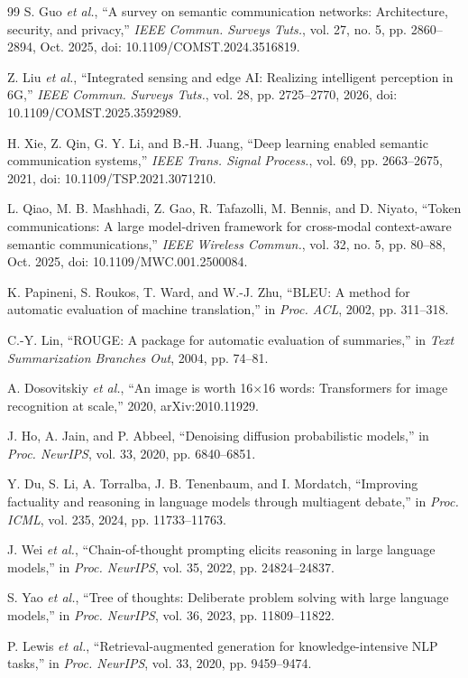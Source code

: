 \documentclass[letterpaper,journal]{IEEEtran}
\newcommand{\etal}{\emph{et al.}}
\begin{document}
\begin{thebibliography}{99}
S. Guo \etal, ``A survey on semantic communication networks: Architecture,
security, and privacy,'' \emph{IEEE Commun. Surveys Tuts.}, vol. 27, no. 5,
pp. 2860--2894, Oct. 2025, doi: 10.1109/COMST.2024.3516819.

Z. Liu \etal, ``Integrated sensing and edge AI: Realizing intelligent
perception in 6G,'' \emph{IEEE Commun. Surveys Tuts.}, vol. 28,
pp. 2725--2770, 2026, doi: 10.1109/COMST.2025.3592989.

H. Xie, Z. Qin, G. Y. Li, and B.-H. Juang, ``Deep learning enabled semantic
communication systems,'' \emph{IEEE Trans. Signal Process.}, vol. 69,
pp. 2663--2675, 2021,
doi: 10.1109/TSP.2021.3071210.

L. Qiao, M. B. Mashhadi, Z. Gao, R. Tafazolli, M. Bennis, and D. Niyato,
``Token communications: A large model-driven framework for cross-modal
context-aware semantic communications,'' \emph{IEEE Wireless Commun.},
vol. 32, no. 5, pp. 80--88, Oct. 2025,
doi: 10.1109/MWC.001.2500084.

K. Papineni, S. Roukos, T. Ward, and W.-J. Zhu, ``BLEU: A method for
automatic evaluation of machine translation,'' in \emph{Proc. ACL}, 2002,
pp. 311--318.

C.-Y. Lin, ``ROUGE: A package for automatic evaluation of summaries,'' in
\emph{Text Summarization Branches Out}, 2004, pp. 74--81.

A. Dosovitskiy \etal, ``An image is worth 16$\times$16 words: Transformers for
image recognition at scale,'' 2020, arXiv:2010.11929.

J. Ho, A. Jain, and P. Abbeel, ``Denoising diffusion probabilistic models,''
in \emph{Proc. NeurIPS}, vol. 33, 2020, pp. 6840--6851.

Y. Du, S. Li, A. Torralba, J. B. Tenenbaum, and I. Mordatch, ``Improving
factuality and reasoning in language models through multiagent debate,''
in \emph{Proc. ICML}, vol. 235, 2024, pp. 11733--11763.

J. Wei \etal, ``Chain-of-thought prompting elicits reasoning in large language
models,'' in \emph{Proc. NeurIPS}, vol. 35, 2022, pp. 24824--24837.

S. Yao \etal, ``Tree of thoughts: Deliberate problem solving with large
language models,'' in \emph{Proc. NeurIPS}, vol. 36, 2023, pp. 11809--11822.

P. Lewis \etal, ``Retrieval-augmented generation for knowledge-intensive NLP
tasks,'' in \emph{Proc. NeurIPS}, vol. 33, 2020, pp. 9459--9474.


\end{thebibliography}
\end{document}
